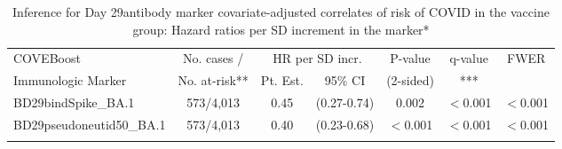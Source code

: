 \begin{longtable}{lcccccc}
\caption{Inference for Day 29antibody marker covariate-adjusted correlates of risk of COVID in the vaccine group: Hazard ratios per SD increment in the marker*} \\ 
   \hline
 
         \multicolumn{1}{l}{COVEBoost} & \multicolumn{1}{c}{No. cases /}   & \multicolumn{2}{c}{HR per SD incr.}                     & \multicolumn{1}{c}{P-value}   & \multicolumn{1}{c}{q-value}   & \multicolumn{1}{c}{FWER} \\ 
         \multicolumn{1}{l}{Immunologic Marker}            & \multicolumn{1}{c}{No. at-risk**} & \multicolumn{1}{c}{Pt. Est.} & \multicolumn{1}{c}{95\% CI} & \multicolumn{1}{c}{(2-sided)} & \multicolumn{1}{c}{***} & \multicolumn{1}{c}{} \\ 
         \hline
 
    BD29bindSpike\_BA.1 & 573/4,013 & 0.45 & (0.27-0.74) & 0.002 & $<$0.001 & $<$0.001 \\ 
  BD29pseudoneutid50\_BA.1 & 573/4,013 & 0.40 & (0.23-0.68) & $<$0.001 & $<$0.001 & $<$0.001 \\ 
   \hline
\hline
\label{tab:CoR_univariable_svycoxph_pretty_scaled}
\end{longtable}

